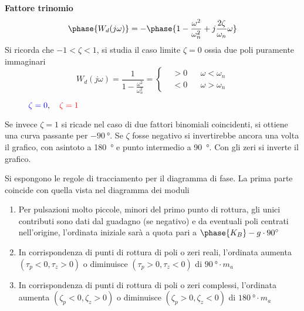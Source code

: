 \newpage
\textbf{Fattore trinomio}
$$
\phase{W_d(j\omega)}  = -
\phase{1-\frac{\omega^2}{\omega_n^2}+j\frac{2\zeta}{\omega_n}\omega}
$$
Si ricorda che $-1<\zeta<1$, si studia il caso limite $\zeta=0$ ossia due poli
puramente immaginari
$$
W_d(j\omega) = \frac{1}{1-\frac{\omega^2}{\omega_n^2}} = \left\{
\begin{aligned}
 &> 0 &  & \omega < \omega_n\\
 &< 0 &  & \omega > \omega_n
\end{aligned}
\right.
$$
\begin{figure}[h]
\centering
{}
\caption{$\textcolor{blue}{\zeta=0},\quad
\textcolor{red}{\zeta=1} $}
\label{fig.phase_trinomio}
\end{figure}

Se invece $\zeta=1$ si ricade nel caso di due fattori binomiali coincidenti,
si ottiene una curva passante per $\SI{-90}{\degree}$.
Se $\zeta$ fosse negativo si invertirebbe ancora una volta il grafico, con
asintoto a \SI{+180}{\degree} e punto intermedio a \SI{+90}{\degree}.
Con gli zeri si inverte il grafico.

Si espongono le regole di tracciamento per il diagramma di fase. La prima parte
coincide con quella vista nel diagramma dei moduli
\begin{enumerate}
 \item Per pulsazioni molto piccole, minori del primo punto di rottura, gli
unici contributi sono dati dal guadagno (se negativo) e da eventuali poli
centrati nell'origine, l'ordinata iniziale sarà a quota pari a $\phase{K_B}
-g\cdot\SI{90}{\degree}$
 \item In corrispondenza di punti di rottura di poli o zeri reali, l'ordinata
aumenta $(\tau_p<0,\tau_z>0)$ o diminuisce $(\tau_p>0,\tau_z<0)$ di
$\SI{90}{\degree}\cdot m_a$
\item In corrispondenza di punti di rottura di poli o zeri complessi,
l'ordinata aumenta $(\zeta_p<0,\zeta_z>0)$ o diminuisce $(\zeta_p>0,\zeta_z<0)$
di $\SI{180}{\degree}\cdot m_a$
\end{enumerate}

